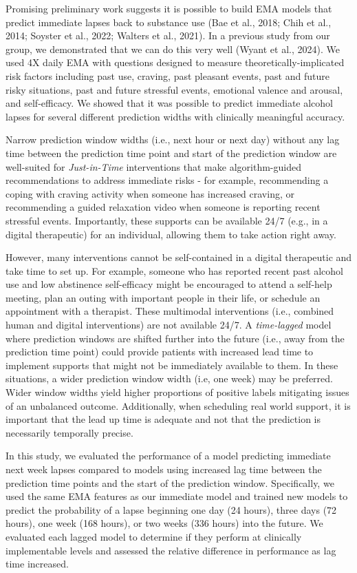 \documentclass[
]{agujournal2019}
\begin{document}
Promising preliminary work suggests it is possible to build EMA models
that predict immediate lapses back to substance use (Bae et al., 2018;
Chih et al., 2014; Soyster et al., 2022; Walters et al., 2021). In a
previous study from our group, we demonstrated that we can do this very
well (Wyant et al., 2024). We used 4X daily EMA with questions designed
to measure theoretically-implicated risk factors including past use,
craving, past pleasant events, past and future risky situations, past
and future stressful events, emotional valence and arousal, and
self-efficacy. We showed that it was possible to predict immediate
alcohol lapses for several different prediction widths with clinically
meaningful accuracy.

Narrow prediction window widths (i.e., next hour or next day) without
any lag time between the prediction time point and start of the
prediction window are well-suited for \emph{Just-in-Time} interventions
that make algorithm-guided recommendations to address immediate risks -
for example, recommending a coping with craving activity when someone
has increased craving, or recommending a guided relaxation video when
someone is reporting recent stressful events. Importantly, these
supports can be available 24/7 (e.g., in a digital therapeutic) for an
individual, allowing them to take action right away.

However, many interventions cannot be self-contained in a digital
therapeutic and take time to set up. For example, someone who has
reported recent past alcohol use and low abstinence self-efficacy might
be encouraged to attend a self-help meeting, plan an outing with
important people in their life, or schedule an appointment with a
therapist. These multimodal interventions (i.e., combined human and
digital interventions) are not available 24/7. A \emph{time-lagged}
model where prediction windows are shifted further into the future
(i.e., away from the prediction time point) could provide patients with
increased lead time to implement supports that might not be immediately
available to them. In these situations, a wider prediction window width
(i.e, one week) may be preferred. Wider window widths yield higher
proportions of positive labels mitigating issues of an unbalanced
outcome. Additionally, when scheduling real world support, it is
important that the lead up time is adequate and not that the prediction
is necessarily temporally precise.

In this study, we evaluated the performance of a model predicting
immediate next week lapses compared to models using increased lag time
between the prediction time points and the start of the prediction
window. Specifically, we used the same EMA features as our immediate
model and trained new models to predict the probability of a lapse
beginning one day (24 hours), three days (72 hours), one week (168
hours), or two weeks (336 hours) into the future. We evaluated each
lagged model to determine if they perform at clinically implementable
levels and assessed the relative difference in performance as lag time
increased.
\end{document}
